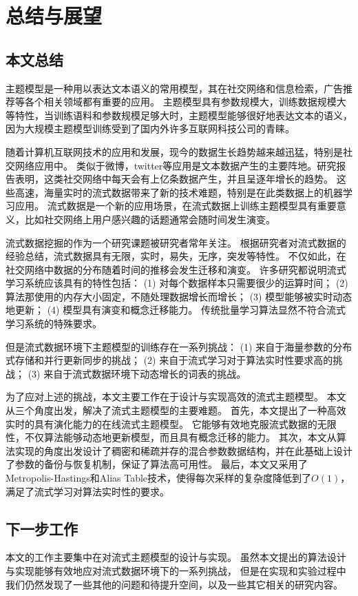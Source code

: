 \chapter{总结与展望}
\label{chapter:summary}
\section{本文总结}

主题模型是一种用以表达文本语义的常用模型，其在社交网络和信息检索，广告推荐等各个相关领域都有重要的应用。
主题模型具有参数规模大，训练数据规模大等特性，当训练语料和参数规模足够大时，主题模型能够很好地表达文本的语义，
因为大规模主题模型训练受到了国内外许多互联网科技公司的青睐。

随着计算机互联网技术的应用和发展，现今的数据生长趋势越来越迅猛，特别是社交网络应用中。
类似于微博，twitter等应用是文本数据产生的主要阵地。研究报告表明，这类社交网络中每天会有上亿条数据产生，并且呈逐年增长的趋势。
这些高速，海量实时的流式数据带来了新的技术难题，特别是在此类数据上的机器学习应用。
流式数据是一个新的应用场景，在流式数据上训练主题模型具有重要意义，比如社交网络上用户感兴趣的话题通常会随时间发生演变。

流式数据挖掘的作为一个研究课题被研究者常年关注。
根据研究者对流式数据的经验总结，流式数据具有无限，实时，易失，无序，突发等特性。
不仅如此，在社交网络中数据的分布随着时间的推移会发生迁移和演变。
许多研究都说明流式学习系统应该具有的特性包括：
(1) 对每个数据样本只需要很少的运算时间；
(2) 算法那使用的内存大小固定，不随处理数据增长而增长；
(3) 模型能够被实时动态地更新；
(4) 模型具有演变和概念迁移能力。
传统批量学习算法显然不符合流式学习系统的特殊要求。

但是流式数据环境下主题模型的训练存在一系列挑战：
(1) 来自于海量参数的分布式存储和并行更新同步的挑战；
(2) 来自于流式学习对于算法实时性要求高的挑战；
(3) 来自于流式数据环境下动态增长的词表的挑战。

为了应对上述的挑战，本文主要工作在于设计与实现高效的流式主题模型。
本文从三个角度出发，解决了流式主题模型的主要难题。
首先，本文提出了一种高效实时的具有演化能力的在线流式主题模型。
它能够有效地克服流式数据的无限性，不仅算法能够动态地更新模型，而且具有概念迁移的能力。
其次，本文从算法实现的角度出发设计了稠密和稀疏并存的混合参数数据结构，并在此基础上设计了参数的备份与恢复机制，保证了算法高可用性。
最后，本文又采用了Metropolis-Hastings和Alias Table技术，使得每次采样的复杂度降低到了$O(1)$，满足了流式学习对算法实时性的要求。


\section{下一步工作}
本文的工作主要集中在对流式主题模型的设计与实现。
虽然本文提出的算法设计与实现能够有效地应对流式数据环境下的一系列挑战，
但是在实现和实验过程中我们仍然发现了一些其他的问题和待提升空间，以及一些其它相关的研究内容。

